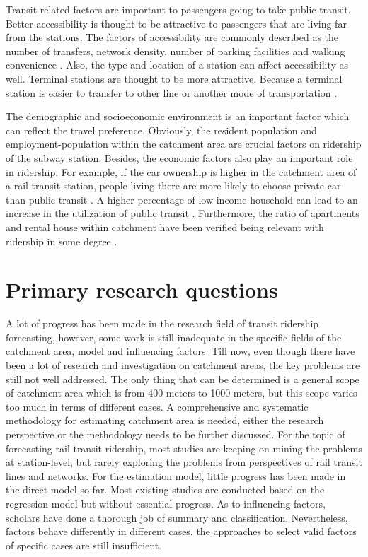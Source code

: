Transit-related factors are important to passengers going to take public transit. Better accessibility is thought to be attractive to passengers that are living far from the stations. The factors of accessibility are commonly described as the number of transfers, network density, number of parking facilities and walking convenience \cite{kuby2004factors,sohn2010factors,taylor2009nature,zhao2014analysis,chu2004ridership}. Also, the type and location of a station can affect accessibility as well. Terminal stations are thought to be more attractive. Because a terminal station is easier to transfer to other line or another mode of transportation \cite{o1996walking}.

The demographic and socioeconomic environment is an important factor which can reflect the travel preference. Obviously, the resident population and employment-population within the catchment area are crucial factors on ridership of the subway station. Besides, the economic factors also play an important role in ridership. For example, if the car ownership is higher in the catchment area of a rail transit station, people living there are more likely to choose private car than public transit \cite{chiou2015factors,zhao2005transit}. A higher percentage of low-income household can lead to an increase in the utilization of public transit \cite{thompson2012really}. Furthermore, the ratio of apartments and rental house within catchment have been verified being relevant with ridership in some degree \cite{jun2015land}.

%
\section{Primary research questions}
A lot of progress has been made in the research field of transit ridership forecasting, however, some work is still inadequate in the specific fields of the catchment area, model and influencing factors. Till now, even though there have been a lot of research and investigation on catchment areas, the key problems are still not well addressed. The only thing that can be determined is a general scope of catchment area which is from 400 meters to 1000 meters, but this scope varies too much in terms of different cases. A comprehensive and systematic methodology for estimating catchment area is needed, either the research perspective or the methodology needs to be further discussed. For the topic of forecasting rail transit ridership, most studies are keeping on mining the problems at station-level, but rarely exploring the problems from perspectives of rail transit lines and networks. For the estimation model, little progress has been made in the direct model so far. Most existing studies are conducted based on the regression model but without essential progress. As to influencing factors, scholars have done a thorough job of summary and classification. Nevertheless, factors behave differently in different cases, the approaches to select valid factors of specific cases are still insufficient. 

